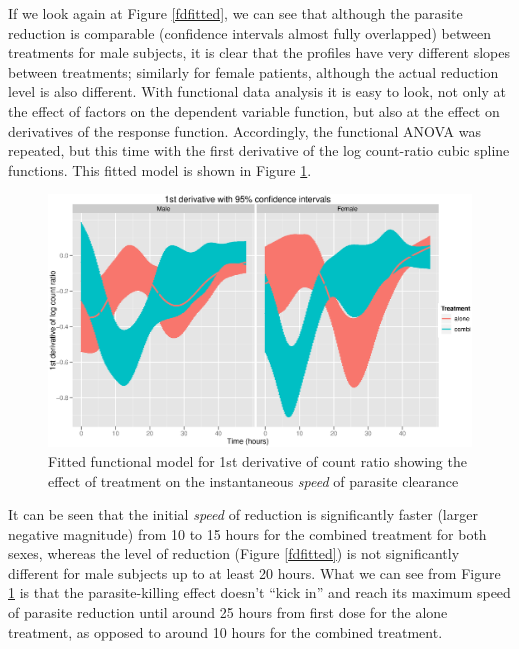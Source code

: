 If we look again at Figure \ref{fdfitted}, we can see that although the parasite reduction is comparable (confidence intervals almost fully overlapped) between treatments for male subjects, it is clear that the profiles have very different slopes between treatments; similarly for female patients, although the actual reduction level is also different. With functional data analysis it is easy to look, not only at the effect of factors on the dependent variable function, but also at the effect on derivatives of the response function. Accordingly, the functional ANOVA was repeated, but this time with the first derivative of the log count-ratio cubic spline functions. This fitted model is shown in Figure \ref{fdspeed}. 
\begin{figure}[p]
\includegraphics[width=150mm]{lprr2ispeed.eps} 
\caption{Fitted functional model for 1st derivative of count ratio showing the effect of treatment on the instantaneous \emph{speed} of parasite clearance}
\label{fdspeed}
\end{figure}

It can be seen that the initial \emph{speed} of reduction is significantly faster (larger negative magnitude) from 10 to 15 hours for the combined treatment for both sexes, whereas the level of reduction (Figure \ref{fdfitted}) is not significantly different for male subjects up to at least 20 hours. What we can see from Figure \ref{fdspeed} is that the parasite-killing effect doesn't ``kick in'' and reach its maximum speed of parasite reduction until around 25 hours from first dose for the alone treatment, as opposed to around 10 hours for the combined treatment.
\clearpage
